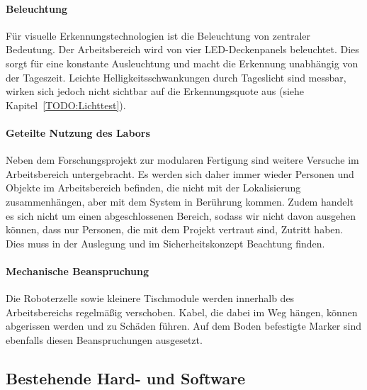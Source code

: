 \paragraph{Beleuchtung}
Für visuelle Erkennungstechnologien ist die Beleuchtung von zentraler Bedeutung. Der Arbeitsbereich wird von vier LED-Deckenpanels beleuchtet. Dies sorgt für eine konstante Ausleuchtung und macht die Erkennung unabhängig von der Tageszeit.
Leichte Helligkeitsschwankungen durch Tageslicht sind messbar, wirken sich jedoch nicht sichtbar auf die Erkennungsquote aus (siehe Kapitel~\ref{TODO:Lichttest}).


\paragraph{Geteilte Nutzung des Labors}
Neben dem Forschungsprojekt zur modularen Fertigung sind weitere Versuche im Arbeitsbereich untergebracht. Es werden sich daher immer wieder Personen und Objekte im Arbeitsbereich befinden, die nicht mit der Lokalisierung zusammenhängen, aber mit dem System in Berührung kommen. Zudem handelt es sich nicht um einen abgeschlossenen Bereich, sodass wir nicht davon ausgehen können, dass nur Personen, die mit dem Projekt vertraut sind, Zutritt haben. Dies muss in der Auslegung und im Sicherheitskonzept Beachtung finden.

\paragraph{Mechanische Beanspruchung}
Die Roboterzelle sowie kleinere Tischmodule werden innerhalb des Arbeitsbereichs regelmäßig verschoben. Kabel, die dabei im Weg hängen, können abgerissen werden und zu Schäden führen. Auf dem Boden befestigte Marker sind ebenfalls diesen Beanspruchungen ausgesetzt.

\subsection{Bestehende Hard- und Software}

